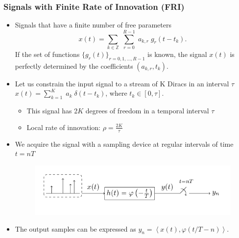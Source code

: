 \documentclass[8pt]{beamer}
\newcommand{\squeezeup}{\vspace{-5mm}}
\begin{document}
\begin{frame}
\frametitle{Signals with Finite Rate of Innovation (FRI)}   %

\begin{itemize}

\item<1->
Signals that have a finite number of free parameters
\begin{equation*}
x(t) = \sum_{k \in \mathbb{Z}} \; \sum_{r=0}^{R-1} \; a_{k,r} \; g_r(t-t_k).
\end{equation*}
If the set of functions $\lbrace g_r(t) \rbrace_{r=0,1,\ldots,R-1}$ is known, 
the signal $x(t)$ is perfectly determined by the coefficients $(a_{k,r}, t_k)$.
\\[.5cm]

\item<2->
Let us constrain the input signal to a stream of K Diracs in an interval $\tau$
$x(t) = \sum_{k=1}^{K} \; a_k \; \delta(t-t_k)$, where $t_k \in [0,\tau]$.\\
\begin{itemize}
\item<3-> This signal has 2$K$ degrees of freedom in a temporal interval $\tau$
\item<3-> Local rate of innovation: $\rho = \tfrac{2K}{\tau}$
\\[.5cm]
\end{itemize}

\item<4-> We acquire the signal with a sampling device at regular intervals of time $t=nT$

\begin{figure}[h]
\includegraphics[width=.8\linewidth]{figures/samplingDeltaTrain}
\end{figure}

\squeezeup
\item<4-> The output samples can be expressed as 
$y_n = \left\langle x(t), \varphi(t/T - n) \right\rangle$.

\end{itemize}

\end{frame}
\end{document}
